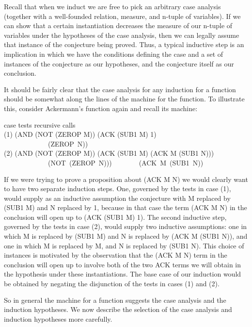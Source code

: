 \documentclass[10pt]{book}
\newenvironment{pubasis}{\begin{flushleft}}{\end{flushleft}}
\begin{document}
Recall that when we induct we are free to pick an
arbitrary case analysis (together with a well-founded relation, measure,
and n-tuple of variables).  If we can show that a certain instantiation
decreases the measure of our n-tuple of variables under the hypotheses of
the case analysis, then we can legally assume that instance of the
conjecture being proved.  Thus, a typical inductive step
is an implication in which we have the conditions defining the
case and a set of instances of the conjecture as our hypotheses, and
the conjecture itself as our conclusion.

It should be fairly clear that the case analysis for any induction for
a function should be somewhat along the lines of the machine for the
function.  To illustrate this, consider Ackermann's function again and recall
its machine:
\begin{pubasis}
case	   tests		recursive calls\\

(1)	(AND (NOT (ZEROP M))	(ACK (SUB1 M) 1)\\
~~~~~~~~~~~~~(ZEROP~N))\\

(2)	(AND (NOT (ZEROP M))	(ACK (SUB1 M) (ACK M (SUB1 N)))\\
~~~~~~~~~~~~~(NOT~(ZEROP~N)))~~~~~~~~(ACK~M~(SUB1~N))\\
\end{pubasis}
If we were trying to prove a proposition about (ACK M N) we would
clearly want to have two separate induction steps.  One, governed
by the tests in case (1), would supply as an inductive assumption
the conjecture with M replaced by (SUB1 M) and N replaced by 1,
because in that case the term (ACK M N) in the conclusion will open up
to (ACK (SUB1 M) 1).  The second inductive step, governed by the
tests in case (2), would supply two inductive assumptions:
one in which M is replaced by (SUB1 M) and N is replaced by (ACK M (SUB1 N)),
and one in which M is replaced by M, and N is replaced by (SUB1 N).  This choice
of instances is motivated by the observation that
the (ACK M N) term in the conclusion will open up to involve both of
the two ACK terms we will obtain in the hypothesis under these
instantiations.  The base case of our induction would be obtained by negating the disjunction
of the tests in cases (1) and (2).

So in general the machine for a function suggests the
case analysis and the induction hypotheses.  We now describe the
selection of the case analysis and induction hypotheses more carefully.
\end{document}
